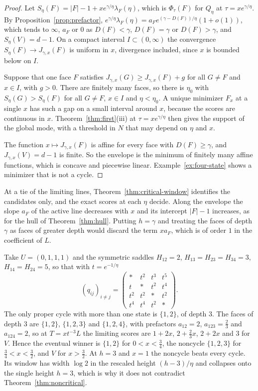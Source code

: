 \begin{proof}
Let $S_\eta(F)=|F|-1+xe^{\gamma/\eta}\lambda_F(\eta)$, which is
$\Phi_\tau(F)$ for $Q_\eta$ at $\tau=xe^{\gamma/\eta}$. By
Proposition~\ref{prop:prefactor},
$e^{\gamma/\eta}\lambda_F(\eta)=a_Fe^{(\gamma-D(F))/\eta}(1+o(1))$, which tends to
$\infty$, $a_F$ or $0$ as $D(F)<\gamma$, $D(F)=\gamma$ or $D(F)>\gamma$, and
$S_\eta(V)=d-1$. On a compact interval $I\subset(0,\infty)$ the convergence
$S_\eta(F)\to J_{\gamma,x}(F)$ is uniform in $x$, divergence included, since
$x$ is bounded below on $I$.

Suppose that one face $F$ satisfies $J_{\gamma,x}(G)\ge J_{\gamma,x}(F)+g$ for
all $G\ne F$ and $x\in I$, with $g>0$. There are finitely many faces, so there
is $\eta_0$ with $S_\eta(G)>S_\eta(F)$ for all $G\ne F$, $x\in I$ and
$\eta<\eta_0$. A unique minimizer $F_x$ at a single $x$ has such a gap on a
small interval around $x$, because the scores are continuous in $x$.
Theorem~\ref{thm:first}(iii) at $\tau=xe^{\gamma/\eta}$ then gives the support
of the global mode, with a threshold in $N$ that may depend on $\eta$ and $x$.

The function $x\mapsto J_{\gamma,x}(F)$ is affine for every face with
$D(F)\ge\gamma$, and $J_{\gamma,x}(V)=d-1$ is finite. So the envelope is the
minimum of finitely many affine functions, which is concave and piecewise
linear. Example~\ref{ex:four-state} shows a minimizer that is not a cycle.
\end{proof}

At a tie of the limiting lines, Theorem~\ref{thm:critical-window} identifies
the candidates only, and the exact scores at each $\eta$ decide. Along the
envelope the slope $a_F$ of the active line decreases with $x$ and its
intercept $|F|-1$ increases, as for the hull of Theorem~\ref{thm:hull}.
Putting $h=\gamma$ and treating the faces of depth $\gamma$ as faces of greater
depth would discard the term $xa_F$, which is of order $1$ in the coefficient
of $L$.

\begin{example}\label{ex:four-state}
Take $U=(0,1,1,1)$ and the symmetric saddles $H_{12}=2$,
$H_{13}=H_{23}=H_{34}=3$, $H_{14}=H_{24}=5$, so that with $t=e^{-1/\eta}$
\[
 (q_{ij})_{i\ne j}=\begin{pmatrix}*&t^2&t^3&t^5\\ t&*&t^2&t^4\\ t^2&t^2&*&t^2\\ t^4&t^4&t^2&*\end{pmatrix}.
\]
The only proper cycle with more than one state is $\{1,2\}$, of depth $3$. The
faces of depth $3$ are $\{1,2\}$, $\{1,2,3\}$ and $\{1,2,4\}$, with prefactors
$a_{12}=2$, $a_{123}=\frac23$ and $a_{124}=2$, so at $T=xt^{-3}L$ the limiting
scores are $1+2x$, $2+\frac23x$, $2+2x$ and $3$ for $V$. Hence the eventual
winner is $\{1,2\}$ for $0<x<\frac34$, the noncycle $\{1,2,3\}$ for
$\frac34<x<\frac32$, and $V$ for $x>\frac32$. At $h=3$ and $x=1$ the noncycle
beats every cycle. Its window has width $\log2$ in the rescaled height
$(h-3)/\eta$ and collapses onto the single height $h=3$, which is why it does
not contradict Theorem~\ref{thm:noncritical}.
\end{example}

